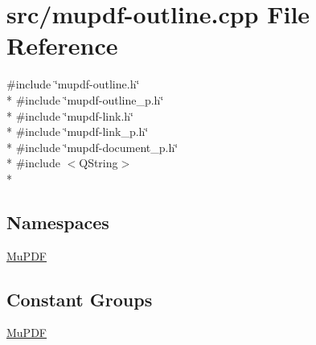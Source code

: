 \hypertarget{mupdf-outline_8cpp}{\section{src/mupdf-\/outline.cpp File Reference}
\label{mupdf-outline_8cpp}
}
{\ttfamily \#include \char`\"{}mupdf-\/outline.\-h\char`\"{}}\\*
{\ttfamily \#include \char`\"{}mupdf-\/outline\-\_\-p.\-h\char`\"{}}\\*
{\ttfamily \#include \char`\"{}mupdf-\/link.\-h\char`\"{}}\\*
{\ttfamily \#include \char`\"{}mupdf-\/link\-\_\-p.\-h\char`\"{}}\\*
{\ttfamily \#include \char`\"{}mupdf-\/document\-\_\-p.\-h\char`\"{}}\\*
{\ttfamily \#include $<$Q\-String$>$}\\*
\subsection*{Namespaces}
\begin{DoxyCompactItemize}
\item 
\hyperlink{namespace_mu_p_d_f}{Mu\-P\-D\-F}
\end{DoxyCompactItemize}
\subsection*{Constant Groups}
\begin{DoxyCompactItemize}
\item 
\hyperlink{namespace_mu_p_d_f}{Mu\-P\-D\-F}
\end{DoxyCompactItemize}
